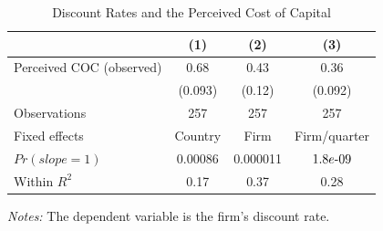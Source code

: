 \begin{table}[htbp]
    \centering
    \caption{Discount Rates and the Perceived Cost of Capital}
    \label{tab:discount_rates_perceived_coc}
    \begin{tabular}{lccc}
        \toprule
        & (1) & (2) & (3) \\
        \midrule
        Perceived COC (observed)
            & 0.68 & 0.43 & 0.36 \\
            & (0.093) & (0.12) & (0.092) \\
        \midrule
        Observations
            & 257 & 257 & 257 \\
        Fixed effects
            & Country & Firm & Firm/quarter \\
        $Pr(slope =1)$
            & 0.00086 & 0.000011 & \(1.8e$-$09\) \\
        Within \(R^2\)
            & 0.17 & 0.37 & 0.28 \\
        \bottomrule
    \end{tabular}

    \begin{minipage}{0.85\linewidth}
        \footnotesize
        \vspace{0.5em}
        \textit{Notes:} The dependent variable is the firm's discount
        rate.
    \end{minipage}
\end{table}